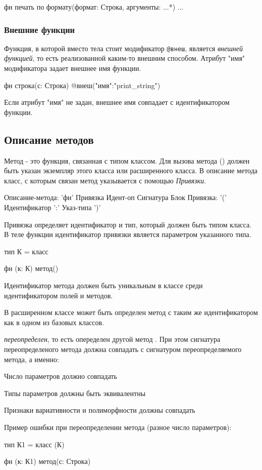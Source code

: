 \begin{Trivil}
фн печать по формату(формат: Строка, аргументы: ...*) {
...
}
\end{Trivil}

\hypertarget{extern-fn}{%
\subsubsection{Внешние функции}\label{decls:extern-fn}}

Функция, в которой вместо тела стоит модификатор \verb|@внеш|, является \emph{внешней функцией}, то есть реализованной каким-то внешним способом.
Атрибут "имя" модификатора задает внешнее имя функции.

\begin{Trivil}
фн строка(с: Строка) @внеш("имя":"print_string")
\end{Trivil}

Если атрибут "имя" не задан, внешнее имя совпадает с идентификатором функции.

\hypertarget{methods}{%
\subsection{Описание методов}\label{decls:methods}}

Метод - это функция, связанная с типом классом. Для вызова метода () должен быть указан экземпляр этого класса или расширенного класса. 
В описание метода класс, с которым связан метод указывается с помощью \emph{Привязки}.

\begin{Grammar}
Описание-метода: 'фн' Привязка Идент-оп Сигнатура Блок
Привязка: '(' Идентификатор ':' Указ-типа ')'
\end{Grammar} 

Привязка определяет идентификатор и тип, который должен быть типом класса. В теле функции идентификатор привязки является параметром указанного типа.

\begin{Trivil}
тип К = класс {}

фн (к: К) метод() {}
\end{Trivil}

Идентификатор метода должен быть уникальным в классе среди идентификатором полей и методов. 

В расширенном классе может быть определен метод с таким же идентификатором как в одном из базовых классов.

\emph{переопределен}, то есть опеределен другой метод . При этом сигнатура переопределеного метода должна совпадать с сигнатуром переопределяемого метода, а именно:
\begin{d_itemize}
\item
    Число параметров должно совпадать
\item
    Типы  параметров должны быть эквивалентны 
\item 
    Признаки вариативности и полиморфности должны совпадать
\end{d_itemize}

Пример ошибки при переопределении метода (разное число параметров):
\begin{SampleErr}[vspace=2pt]
тип К1 = класс (К) {}

фн (к: К1) метод(с: Строка) {}
\end{SampleErr}